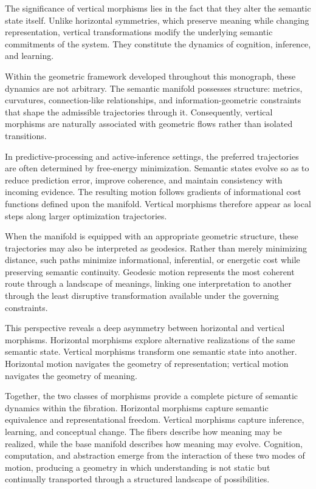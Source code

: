 \documentclass[12pt,letterpaper]{article}
\theoremstyle{remark}
\begin{document}
The significance of vertical morphisms lies in the fact that they alter the semantic state itself. Unlike horizontal symmetries, which preserve meaning while changing representation, vertical transformations modify the underlying semantic commitments of the system. They constitute the dynamics of cognition, inference, and learning.

Within the geometric framework developed throughout this monograph, these dynamics are not arbitrary. The semantic manifold possesses structure: metrics, curvatures, connection-like relationships, and information-geometric constraints that shape the admissible trajectories through it. Consequently, vertical morphisms are naturally associated with geometric flows rather than isolated transitions.

In predictive-processing and active-inference settings, the preferred trajectories are often determined by free-energy minimization. Semantic states evolve so as to reduce prediction error, improve coherence, and maintain consistency with incoming evidence. The resulting motion follows gradients of informational cost functions defined upon the manifold. Vertical morphisms therefore appear as local steps along larger optimization trajectories.

When the manifold is equipped with an appropriate geometric structure, these trajectories may also be interpreted as geodesics. Rather than merely minimizing distance, such paths minimize informational, inferential, or energetic cost while preserving semantic continuity. Geodesic motion represents the most coherent route through a landscape of meanings, linking one interpretation to another through the least disruptive transformation available under the governing constraints.

This perspective reveals a deep asymmetry between horizontal and vertical morphisms. Horizontal morphisms explore alternative realizations of the same semantic state. Vertical morphisms transform one semantic state into another. Horizontal motion navigates the geometry of representation; vertical motion navigates the geometry of meaning.

Together, the two classes of morphisms provide a complete picture of semantic dynamics within the fibration. Horizontal morphisms capture semantic equivalence and representational freedom. Vertical morphisms capture inference, learning, and conceptual change. The fibers describe how meaning may be realized, while the base manifold describes how meaning may evolve. Cognition, computation, and abstraction emerge from the interaction of these two modes of motion, producing a geometry in which understanding is not static but continually transported through a structured landscape of possibilities.
\end{document}
